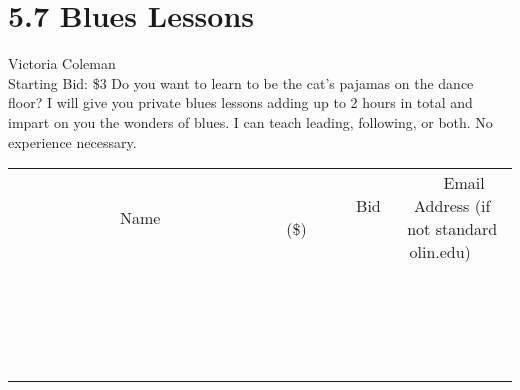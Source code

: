\documentclass[11pt]{article}
\begin{document}
\section*{5.7 Blues Lessons}
Victoria Coleman
\\
Starting Bid: \$3
\newline
Do you want to learn to be the cat's pajamas on the dance floor? I will give you private blues lessons adding up to 2 hours in total and impart on you the wonders of blues. I can teach leading, following, or both. No experience necessary.
\\[3ex]
\begin{tabular}{c c c}
~~~~~~~~~~~~~Name~~~~~~~~~~~~~ & ~~~~~~~~~Bid (\$)~~~~~~~~~  & ~~~Email Address (if not standard olin.edu)~~~\\
 & & \\
\hline
 & & \\
\hline
 & & \\
\hline
 & & \\
\hline
 & & \\
\hline
 & & \\
\hline
 & & \\
\hline
 & & \\
\hline
 & & \\
\hline
 & & \\
\hline
 & & \\
\hline
 & & \\
\hline
 & & \\
\hline
 & & \\
\hline
 & & \\
\hline
 & & \\
\hline
 & & \\
\hline
 & & \\
\hline
 & & \\
\hline
\end{tabular}
\newpage
\end{document}
